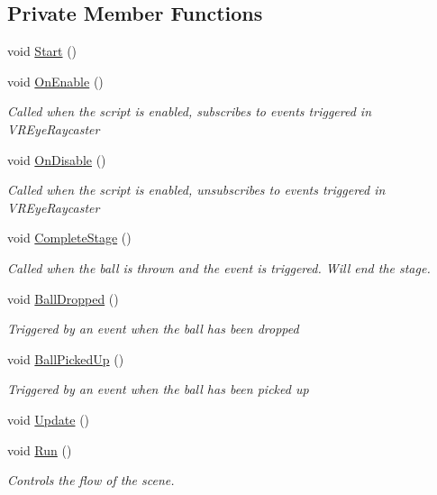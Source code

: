 \subsection*{Private Member Functions}
\begin{DoxyCompactItemize}
\item 
void \mbox{\hyperlink{class_stage5_ac70bd321f425cb2917a1e8a20cba8524}{Start}} ()
\item 
void \mbox{\hyperlink{class_stage5_ac5bc96024542fdf588a18a7e6de7892f}{On\+Enable}} ()
\begin{DoxyCompactList}\small\item\em Called when the script is enabled, subscribes to events triggered in V\+R\+Eye\+Raycaster \end{DoxyCompactList}\item 
void \mbox{\hyperlink{class_stage5_afd72a075c088e399a206482e8be39cce}{On\+Disable}} ()
\begin{DoxyCompactList}\small\item\em Called when the script is enabled, unsubscribes to events triggered in V\+R\+Eye\+Raycaster \end{DoxyCompactList}\item 
void \mbox{\hyperlink{class_stage5_a1cdfae544606e8537d2dd31e5ed2ea83}{Complete\+Stage}} ()
\begin{DoxyCompactList}\small\item\em Called when the ball is thrown and the event is triggered. Will end the stage. \end{DoxyCompactList}\item 
void \mbox{\hyperlink{class_stage5_a0d60946476d491834a1f2e41e74da306}{Ball\+Dropped}} ()
\begin{DoxyCompactList}\small\item\em Triggered by an event when the ball has been dropped \end{DoxyCompactList}\item 
void \mbox{\hyperlink{class_stage5_a06516c2e958f8fea48f5d88924649ba4}{Ball\+Picked\+Up}} ()
\begin{DoxyCompactList}\small\item\em Triggered by an event when the ball has been picked up \end{DoxyCompactList}\item 
void \mbox{\hyperlink{class_stage5_a1eff3e21d86d4460f57f86e692f50af3}{Update}} ()
\item 
void \mbox{\hyperlink{class_stage5_a36b22a4efd98ae6ba0b0b4cd9e058094}{Run}} ()
\begin{DoxyCompactList}\small\item\em Controls the flow of the scene. \end{DoxyCompactList}\item 

\end{DoxyCompactItemize}
